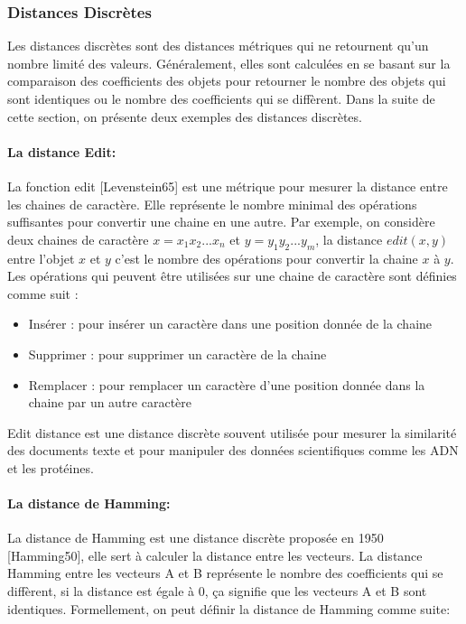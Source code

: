 \subsubsection{Distances Discrètes}
Les distances discrètes sont des distances métriques qui ne retournent qu’un nombre limité des valeurs. Généralement, elles sont calculées en se basant sur la comparaison des coefficients des objets pour retourner le nombre des objets qui sont identiques ou le nombre des coefficients qui se diffèrent. Dans la suite de cette section, on présente deux exemples des distances discrètes.

\paragraph{La distance Edit:}
La fonction edit [Levenstein65] est une métrique pour mesurer la distance entre les chaines de caractère. Elle représente le nombre minimal des opérations suffisantes pour convertir une chaine en une autre. Par exemple, on considère deux chaines de caractère $x=x_1x_2...x_n$ et $y=y_1y_2...y_m$, la distance $edit(x,y)$ entre l’objet $x$ et $y$ c’est le nombre des opérations pour convertir la chaine $x$ à $y$. Les opérations qui peuvent être utilisées sur une chaine de caractère sont définies comme suit :
\begin{itemize}
	\item Insérer : pour insérer un caractère dans une position donnée de la chaine
	\item Supprimer : pour supprimer un caractère de la chaine
	\item Remplacer : pour remplacer un caractère d’une position donnée dans la chaine par un autre caractère
\end{itemize}
Edit distance est une distance discrète souvent utilisée pour mesurer la similarité des documents texte et pour manipuler des données scientifiques comme les ADN et les protéines.

\paragraph{La distance de Hamming:}
La distance de Hamming est une distance discrète proposée en 1950 [Hamming50], elle sert à calculer la distance entre les vecteurs. La distance Hamming entre les vecteurs A et B représente le nombre des coefficients qui se diffèrent, si la distance est égale à 0, ça signifie que les vecteurs A et B sont identiques. Formellement, on peut définir la distance de Hamming comme suite:

